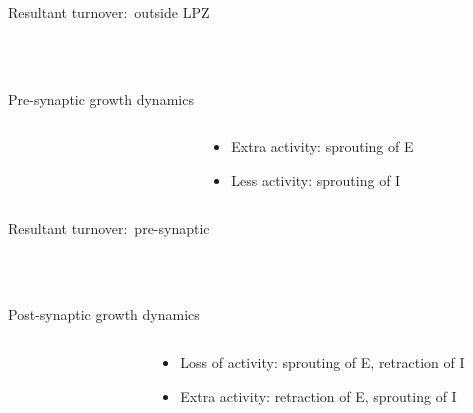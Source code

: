 \begin{frame}[c]{Resultant turnover:\ outside LPZ}
  \begin{figure}[t]
    \centering
    \resizebox{0.6\textwidth}{!}{}\\%
    \resizebox{0.6\textwidth}{!}{}\\%
    \resizebox{0.6\textwidth}{!}{}
  \end{figure}
\end{frame}
\begin{frame}[c]{Pre-synaptic growth dynamics}
  \begin{columns}
    \begin{column}{0.5\textwidth}
      \begin{figure}[h]
        
      \end{figure}
    \end{column}
    \begin{column}{0.6\textwidth}
      \centering
      \begin{itemize}
        \item Extra activity: sprouting of E
        \item Less activity: sprouting of I
      \end{itemize}
    \end{column}
  \end{columns}
\end{frame}
\begin{frame}[c]{Resultant turnover:\ pre-synaptic}
  \begin{figure}[!t]
    \centering
    \resizebox{0.6\textwidth}{!}{}\\%
    \resizebox{0.6\textwidth}{!}{}\\%
    \resizebox{0.6\textwidth}{!}{}
  \end{figure}
\end{frame}
\begin{frame}[c]{Post-synaptic growth dynamics}
  \begin{columns}
    \begin{column}{0.5\textwidth}
      \begin{figure}[h]
        
      \end{figure}
    \end{column}
    \begin{column}{0.6\textwidth}
      \centering
      \begin{itemize}
        \item Loss of activity: sprouting of E, retraction of I
        \item Extra activity: retraction of E, sprouting of I
      \end{itemize}
    \end{column}
  \end{columns}
\end{frame}
